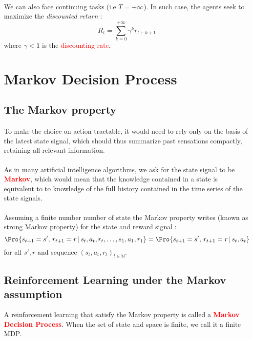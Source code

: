 \documentclass[a4paper]{article}
\begin{document}
{	\paragraph{} We can also face continuing tasks (i.e $T=+\infty$). In such case, the agents seek to maximize the \emph{discounted return} : 
	\begin{equation}
		R_t = \sum_{k=0}^{+\infty} \gamma^kr_{t+k+1}
	\end{equation}
	where $\gamma<1$ is the \textcolor{red}{discounting rate}. 
	}

	\section{Markov Decision Process}
	{
		\subsection{The Markov property}
		{
			\paragraph{} To make the choice on action tractable, it would need to rely only on the basis of the latest state signal, which should thus summarize past sensations compactly, retaining all relevant information. 
			
			\paragraph{} As in many artificial intelligence algorithms, we ask for the state signal to be \textbf{\textcolor{red}{Markov}}, which would mean that the knowledge contained in a state is equivalent to to knowledge of the full history contained in the time series of the state signals. 
			
			\paragraph{} Assuming a finite number number of state the Markov property writes (known as strong Markov property) for the state and reward signal : 
			\begin{equation}
				\Pro{ s_{t+1} = s',\, r_{t+1}=r \, \vert \, s_{t}, a_t, r_t ,\hdots, s_{1}, a_{1}, r_1} = \Pro{ s_{t+1} = s',\, r_{t+1}=r \, \vert \, s_{t}, a_{t} }
			\end{equation}
			for all $s',r$ and sequence $(s_t,a_t,r_t)_{t\in\mathbb{N}}$. 
		}
		
		\subsection{Reinforcement Learning under the Markov assumption}
		{
			A reinforcement learning that satisfy the Markov property is called a \textbf{\textcolor{red}{Markov Decision Process}}. When the set of state and space is finite, we call it a finite MDP.  
		}
		
}
\end{document}
